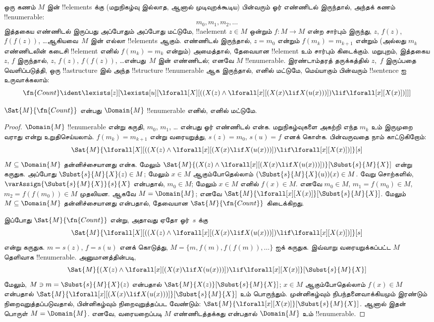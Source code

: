 \documentclass[../../../include/open-logic-section]{subfiles}
\begin{document}
ஒரு கணம் $M$ இன் !!{element}s க்கு (மறுநிகழ்வு இல்லாத, ஆனால்
முடிவுறக்கூடிய) பின்வரும் ஓர் எண்ணிடல் இருந்தால், அந்தக் கணம்
!!{enumerable}:
\[
m_0, m_1, m_2, \dots
\]
இத்தகைய எண்ணிடல் இருப்பது அப்போதும் அப்போது மட்டுமே,
!!a{element} $z \in M$ ஒன்றும் $f\colon M \to M$ என்ற சார்பும் இருந்து,
$z$, $f(z)$, $f(f(z))$, \dots ஆகியவை~$M$ இன் எல்லா
!!{element}s ஆகும். எண்ணிடல் இருந்தால், $z = m_0$ என்றும்
$f(m_k) = m_{k+1}$ என்றும் (அல்லது $m_k$ எண்ணிடலின் கடைசி
!!{element} எனில் $f(m_k) = m_k$ என்றும்) அமைத்தால், தேவையான
!!{element} உம் சார்பும் கிடைக்கும். மறுபுறம், இத்தகைய $z$, $f$
இருந்தால், $z$, $f(z)$, $f(f(z))$, \dots என்பது~$M$ இன் எண்ணிடல்;
எனவே $M$ !!{enumerable}. இரண்டாம்தரத் தருக்கத்தில் $z$,~$f$
இருப்பதை வெளிப்படுத்தி, ஒரு !!a{structure} இல் அந்த !!{structure}
!!{enumerable} ஆக இருந்தால், எனில் மட்டுமே, மெய்யாகும் பின்வரும்
!!{sentence} ஐ உருவாக்கலாம்:
\[
\fn{Count} \ident
\lexists[z][\lexists[u][\lforall[X][((X(z) \land
      \lforall[x][(X(x) \lif X(u(x)))]) \lif \lforall[x][X(x)])]]]
\]

\begin{prop}
$\Sat{M}{\fn{Count}}$ என்பது $\Domain{M}$ !!{enumerable} எனில்,
எனில் மட்டுமே.
\end{prop}

\begin{proof}
$\Domain{M}$ !!{enumerable} என்று கருதி, $m_0$, $m_1$, \dots
என்பது ஓர் எண்ணிடல் என்க. மறுநிகழ்வுகளை அகற்றி எந்த $m_k$ உம்
இருமுறை வராது என்று உறுதிசெய்யலாம். $f(m_k) = m_{k+1}$ என்று
வரையறுத்து, $s(z) = m_0$, $s(u) = f$ எனக் கொள்க. பின்வருவதை
நாம் காட்டுகிறோம்:
\[
\Sat{M}{\lforall[X][((X(z) \land \lforall[x][(X(x) \lif X(u(x)))])
    \lif \lforall[x][X(x)])]}[s]
\]
$M \subseteq \Domain{M}$ தன்னிச்சையானது என்க. மேலும்
$\Sat{M}{(X(z) \land \lforall[x][(X(x) \lif
X(u(x)))])}[\Subst{s}{M}{X}]$ என்று கருதுக. அப்போது
$\Subst{s}{M}{X}(z) \in M$; மேலும் $x \in M$ ஆகும்போதெல்லாம்
$(\Subst{s}{M}{X}(u))(x) \in M$. வேறு சொற்களில்,
$\varAssign{\Subst{s}{M}{X}}{s}{X}$ என்பதால், $m_0 \in M$;
மேலும் $x \in M$ எனில் $f(x) \in M$. எனவே $m_0 \in M$,
$m_1 = f(m_0) \in M$, $m_2 = f(f(m_0)) \in M$ முதலியன.
ஆகவே $M = \Domain{M}$; எனவே
$\Sat{M}{\lforall[x][X(x)]}[\Subst{s}{M}{X}]$. மேலும்
$M \subseteq \Domain{M}$ தன்னிச்சையானது என்பதால், தேவையான
$\Sat{M}{\fn{Count}}$ கிடைக்கிறது.

இப்போது $\Sat{M}{\fn{Count}}$ என்று, அதாவது ஏதோ ஓர்~$s$ க்கு
\[
\Sat{M}{\lforall[X][((X(z) \land \lforall[x][(X(x) \lif X(u(x)))])
    \lif \lforall[x][X(x)])]}[s]
\]
என்று கருதுக. $m = s(z)$, $f = s(u)$ எனக் கொடுத்து,
$M = \{m, f(m), f(f(m)), \dots\}$ ஐக் கருதுக. இவ்வாறு
வரையறுக்கப்பட்ட $M$ தெளிவாக !!{enumerable}. அனுமானத்தின்படி,
\[
\Sat{M}{(X(z) \land \lforall[x][(X(x) \lif X(u(x)))])
    \lif \lforall[x][X(x)]}[\Subst{s}{M}{X}]
\]
மேலும், $M \ni m = \Subst{s}{M}{X}(z)$ என்பதால்
$\Sat{M}{X(z)}[\Subst{s}{M}{X}]$; $x \in M$ ஆகும்போதெல்லாம்
$f(x) \in M$ என்பதால்
$\Sat{M}{\lforall[x][(X(x) \lif
X(u(x)))]}[\Subst{s}{M}{X}]$ உம் பொருந்தும். முன்னிகழ்வும்
நிபந்தனைவாக்கியமும் இரண்டும் நிறைவுறுத்தப்படுவதால், பின்னிகழ்வும்
நிறைவுறுத்தப்பட வேண்டும்:
$\Sat{M}{\lforall[x][X(x)]}[\Subst{s}{M}{X}]$. ஆனால் இதன் பொருள்
$M = \Domain{M}$. எனவே, வரையறைப்படி $M$ எண்ணிடத்தக்கது என்பதால்
$\Domain{M}$ உம் !!{enumerable}.
\end{proof}
\end{document}
